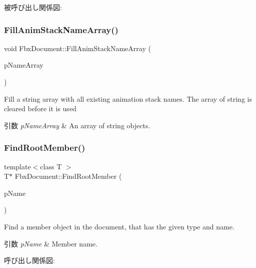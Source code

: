 被呼び出し関係図\+:
\mbox{\label{class_fbx_document_a7a60224db8d86ec61e66263bbb683d4e}} 
\subsubsection{\texorpdfstring{Fill\+Anim\+Stack\+Name\+Array()}{FillAnimStackNameArray()}}
{\footnotesize\ttfamily void Fbx\+Document\+::\+Fill\+Anim\+Stack\+Name\+Array (\begin{DoxyParamCaption}\item[{\hyperlink{class_fbx_array}{Fbx\+Array}$<$ \hyperlink{class_fbx_string}{Fbx\+String} $\ast$$>$ \&}]{p\+Name\+Array }\end{DoxyParamCaption})}

Fill a string array with all existing animation stack names. The array of string is cleared before it is used 
\begin{DoxyParams}{引数}
{\em p\+Name\+Array} & An array of string objects. \\
\hline
\end{DoxyParams}
\mbox{\label{class_fbx_document_a0bbbf150471a9166a598a01fbd535894}} 
\subsubsection{\texorpdfstring{Find\+Root\+Member()}{FindRootMember()}}
{\footnotesize\ttfamily template$<$class T $>$ \\
T$\ast$ Fbx\+Document\+::\+Find\+Root\+Member (\begin{DoxyParamCaption}\item[{char $\ast$}]{p\+Name }\end{DoxyParamCaption})}

Find a member object in the document, that has the given type and name. 
\begin{DoxyParams}{引数}
{\em p\+Name} & Member name. \\
\hline
\end{DoxyParams}
呼び出し関係図\+:
\mbox{\label{class_fbx_document_aefcce26df173f0391b6540c003c52ea9}} 

